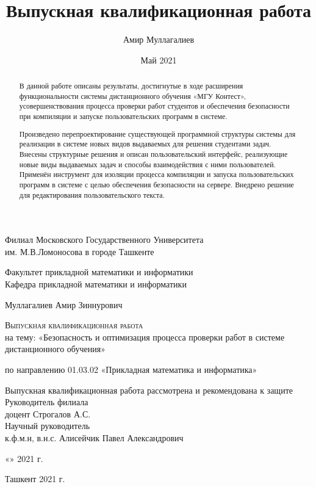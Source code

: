 \documentclass[a4paper]{article}
\title{Выпускная квалификационная работа}
\author{Амир Муллагалиев}
\date{Май 2021}
\begin{document}
\begin{titlepage}
    \begin{center}
        Филиал Московского Государственного Университета\\
        им. М.В.Ломоносова в городе Ташкенте
        \vspace{0.4cm}

        Факультет прикладной математики и информатики\\
        Кафедра прикладной математики и информатики
        \vfill


        Муллагалиев Амир Зиннурович
        \vfill

        {\Large\textsc{Выпускная квалификационная работа}}\\
        на тему: «Безопасность и оптимизация процесса проверки работ в системе дистанционного обучения»
        \bigskip

        по направлению 01.03.02 «Прикладная математика и информатика»
    \end{center}
\vfill

\begin{flushleft}
Выпускная квалификационная работа рассмотрена и рекомендована к защите\\
Руководитель филиала\\
доцент Строгалов А.С.\\
Научный руководитель\\
к.ф.м.н, в.н.с. Алисейчик Павел Александрович
\end{flushleft}
\vspace{0.2cm}
\begin{flushright}
«\underline{\hspace{0.7cm}}» \underline{\hspace{3cm}} 2021 г.
\end{flushright}
\vspace{0.7cm}

\begin{center}
Ташкент 2021 г.
\end{center}
\end{titlepage}



\newpage
\begin{abstract}
В данной работе описаны результаты, достигнутые в ходе расширения функциональности системы дистанционного обучения «МГУ Контест», усовершенствования процесса проверки работ студентов и обеспечения безопасности при компиляции и запуске пользовательских программ в системе.

Произведено перепроектирование существующей программной структуры системы для реализации в системе новых видов выдаваемых для решения студентами задач. Внесены структурные решения и описан пользовательский интерфейс, реализующие новые виды выдаваемых задач и способы взаимодействия с ними пользователей. Применён инструмент для изоляции процесса компиляции и запуска пользовательских программ в системе с целью обеспечения безопасности на сервере. Внедрено решение для редактирования пользовательского текста.
\end{abstract}
\end{document}
